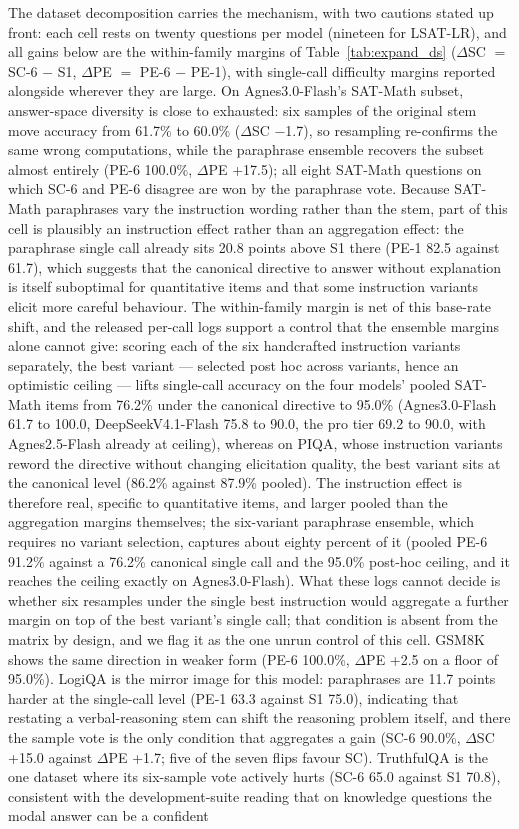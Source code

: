 The dataset decomposition carries the mechanism, with two cautions stated up front: each cell rests on twenty questions per model (nineteen for LSAT-LR), and all gains below are the within-family margins of Table~\ref{tab:expand_ds} ($\Delta$SC $=$ SC-6 $-$ S1, $\Delta$PE $=$ PE-6 $-$ PE-1), with single-call difficulty margins reported alongside wherever they are large. On Agnes3.0-Flash's SAT-Math subset, answer-space diversity is close to exhausted: six samples of the original stem move accuracy from 61.7\% to 60.0\% ($\Delta$SC $-$1.7), so resampling re-confirms the same wrong computations, while the paraphrase ensemble recovers the subset almost entirely (PE-6 100.0\%, $\Delta$PE +17.5); all eight SAT-Math questions on which SC-6 and PE-6 disagree are won by the paraphrase vote. Because SAT-Math paraphrases vary the instruction wording rather than the stem, part of this cell is plausibly an instruction effect rather than an aggregation effect: the paraphrase single call already sits 20.8 points above S1 there (PE-1 82.5 against 61.7), which suggests that the canonical directive to answer without explanation is itself suboptimal for quantitative items and that some instruction variants elicit more careful behaviour. The within-family margin is net of this base-rate shift, and the released per-call logs support a control that the ensemble margins alone cannot give: scoring each of the six handcrafted instruction variants separately, the best variant --- selected post hoc across variants, hence an optimistic ceiling --- lifts single-call accuracy on the four models' pooled SAT-Math items from 76.2\% under the canonical directive to 95.0\% (Agnes3.0-Flash 61.7 to 100.0, DeepSeekV4.1-Flash 75.8 to 90.0, the pro tier 69.2 to 90.0, with Agnes2.5-Flash already at ceiling), whereas on PIQA, whose instruction variants reword the directive without changing elicitation quality, the best variant sits at the canonical level (86.2\% against 87.9\% pooled). The instruction effect is therefore real, specific to quantitative items, and larger pooled than the aggregation margins themselves; the six-variant paraphrase ensemble, which requires no variant selection, captures about eighty percent of it (pooled PE-6 91.2\% against a 76.2\% canonical single call and the 95.0\% post-hoc ceiling, and it reaches the ceiling exactly on Agnes3.0-Flash). What these logs cannot decide is whether six resamples under the single best instruction would aggregate a further margin on top of the best variant's single call; that condition is absent from the matrix by design, and we flag it as the one unrun control of this cell. GSM8K shows the same direction in weaker form (PE-6 100.0\%, $\Delta$PE +2.5 on a floor of 95.0\%). LogiQA is the mirror image for this model: paraphrases are 11.7 points harder at the single-call level (PE-1 63.3 against S1 75.0), indicating that restating a verbal-reasoning stem can shift the reasoning problem itself, and there the sample vote is the only condition that aggregates a gain (SC-6 90.0\%, $\Delta$SC +15.0 against $\Delta$PE +1.7; five of the seven flips favour SC). TruthfulQA is the one dataset where its six-sample vote actively hurts (SC-6 65.0 against S1 70.8), consistent with the development-suite reading that on knowledge questions the modal answer can be a confident 